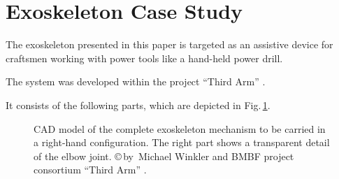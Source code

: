 \documentclass{svproc}
\begin{document}
\section{Exoskeleton Case Study}
\label{sec:exo_scenario}

The exoskeleton presented in this paper is targeted as an assistive device for craftsmen working with power tools like a hand-held power drill.

The system was developed within the project ``Third Arm'' \cite{NuelleSchTapLil2017}.

It consists of the following parts, which are depicted in Fig.\,\ref{fig:KAS5_CAD}.

\begin{figure}[b!]
    \vspace{-0.3cm}
    
    \vspace{-0.3cm}
    \caption{CAD model of the complete exoskeleton mechanism to be carried in a right-hand configuration. The right part shows a transparent detail of the elbow joint.
    \copyright\,by~Michael Winkler and BMBF project consortium ``Third Arm'' \cite{NuelleSchTapLil2017}.}
    \label{fig:KAS5_CAD}
\end{figure} 
\end{document}
